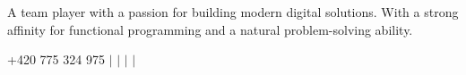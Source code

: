
\hfill

\vspace{2pt}
\parbox{\textwidth}{
  \footnotesize
  A team player with a passion for building modern digital solutions. With a strong affinity for functional programming and a natural problem-solving ability.
}
\vspace{2pt}

\faPhone
\thinspace \thinspace
\small{+420 775 324 975} $|$
\href{mailto:contact@erikkurjak.com}{
  \thinspace \thinspace
} $|$
\href{https://linkedin.com/in/erik-kurjak}{
  \thinspace \thinspace
} $|$
\href{https://github.com/powdee}{
  \thinspace \thinspace
} $|$
\href{https://erikkurjak.com}{
}
